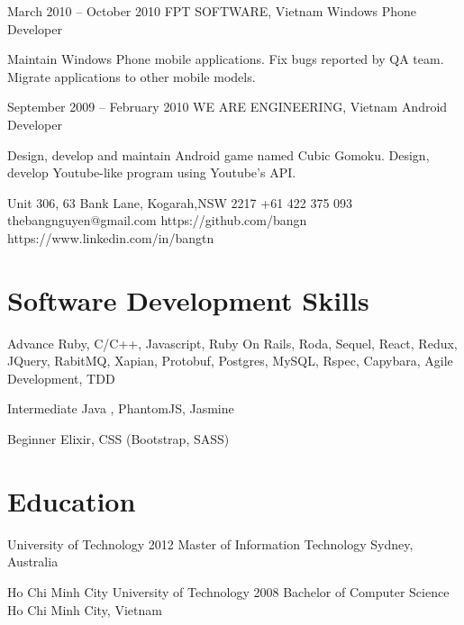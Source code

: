 \documentclass{tccv}
\begin{document}
\begin{eventlist}
\item{March 2010 -- October 2010}
     {FPT SOFTWARE, Vietnam}
     {Windows Phone Developer}

Maintain Windows Phone mobile applications.
Fix bugs reported by QA team.
Migrate applications to other mobile models.

\item{September 2009 -- February 2010}
     {WE ARE ENGINEERING, Vietnam}
     {Android Developer}

Design, develop and maintain Android game named Cubic Gomoku.
Design, develop Youtube-like program using Youtube's API.

\end{eventlist}

\personal
    {Unit 306, 63 Bank Lane, Kogarah,\newline NSW 2217}
    {+61 422 375 093}
    {thebangnguyen@gmail.com}
    {https://github.com/bangn}
    {https://www.linkedin.com/in/bangtn}

\section{Software Development Skills}

\begin{factlist}

\item{Advance}
     {Ruby, C/C++, Javascript,
     Ruby On Rails, Roda, Sequel, React, Redux, JQuery,
     RabitMQ, Xapian, Protobuf,
     Postgres, MySQL,
     \newline Rspec, Capybara,
     \newline Agile Development, TDD}

\item{Intermediate}
     {Java , PhantomJS, Jasmine}

\item{Beginner}
     {Elixir, CSS (Bootstrap, SASS)}
\end{factlist}

\section{Education}

\begin{yearlist}

\item[University of Technology]{2012}
     {Master of Information Technology}
     {Sydney, Australia}

\item[Ho Chi Minh City University of Technology]{2008}
     {Bachelor of Computer Science}
     {Ho Chi Minh City, Vietnam}

\end{yearlist}
\end{document}
